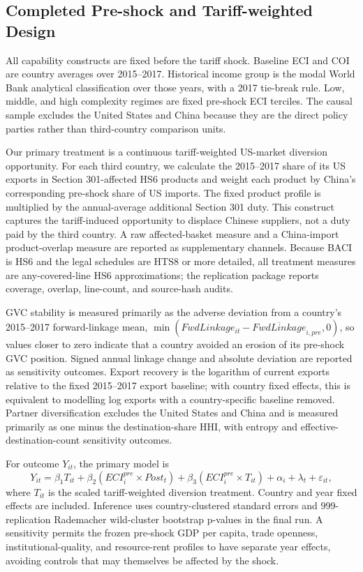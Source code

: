 \subsection{Completed Pre-shock and Tariff-weighted Design}
All capability constructs are fixed before the tariff shock. Baseline ECI and COI are country averages over 2015--2017. Historical income group is the modal World Bank analytical classification over those years, with a 2017 tie-break rule. Low, middle, and high complexity regimes are fixed pre-shock ECI terciles. The causal sample excludes the United States and China because they are the direct policy parties rather than third-country comparison units.

Our primary treatment is a continuous tariff-weighted US-market diversion opportunity. For each third country, we calculate the 2015--2017 share of its US exports in Section 301-affected HS6 products and weight each product by China's corresponding pre-shock share of US imports. The fixed product profile is multiplied by the annual-average additional Section 301 duty. This construct captures the tariff-induced opportunity to displace Chinese suppliers, not a duty paid by the third country. A raw affected-basket measure and a China-import product-overlap measure are reported as supplementary channels. Because BACI is HS6 and the legal schedules are HTS8 or more detailed, all treatment measures are any-covered-line HS6 approximations; the replication package reports coverage, overlap, line-count, and source-hash audits.

GVC stability is measured primarily as the adverse deviation from a country's 2015--2017 forward-linkage mean, \(\min(FwdLinkage_{it}-\overline{FwdLinkage}_{i,pre},0)\), so values closer to zero indicate that a country avoided an erosion of its pre-shock GVC position. Signed annual linkage change and absolute deviation are reported as sensitivity outcomes. Export recovery is the logarithm of current exports relative to the fixed 2015--2017 export baseline; with country fixed effects, this is equivalent to modelling log exports with a country-specific baseline removed. Partner diversification excludes the United States and China and is measured primarily as one minus the destination-share HHI, with entropy and effective-destination-count sensitivity outcomes.

For outcome \(Y_{it}\), the primary model is
\begin{equation}
Y_{it}=\beta_1 T_{it}+\beta_2(ECI_i^{pre}\times Post_t)+\beta_3(ECI_i^{pre}\times T_{it})+\alpha_i+\lambda_t+\varepsilon_{it},
\end{equation}
where \(T_{it}\) is the scaled tariff-weighted diversion treatment. Country and year fixed effects are included. Inference uses country-clustered standard errors and 999-replication Rademacher wild-cluster bootstrap p-values in the final run. A sensitivity permits the frozen pre-shock GDP per capita, trade openness, institutional-quality, and resource-rent profiles to have separate year effects, avoiding controls that may themselves be affected by the shock.


